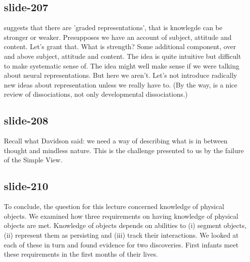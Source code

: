 \documentclass[12pt,\papersize]{extarticle}
\begin{document}
 
\subsection{slide-207}
\citet{Munakata:2001ch} suggests that there are 'graded representations', that is knowlegde can be stronger or weaker.
Presupposes we have an account of subject, attitude and content. Let's grant that.
What is strength? Some additional component, over and above subject, attitude and content.
The idea is quite intuitive but difficult to make systematic sense of.
The idea might well make sense if we were talking about neural representations.
But here we aren't. Let's not introduce radically new ideas about representation unless we really have to.
(By the way, \citet{Munakata:2001ch} is a nice review of dissociations, not only developmental dissociations.)
 
 
\subsection{slide-208}
Recall what Davidson said: we need a way of describing what is in between thought and mindless nature. This is the challenge presented to us by the failure of the Simple View.
 
 
\subsection{slide-210}
To conclude, the question for this lecture concerned knowledge of physical objects.
We examined how three requirements on having knowledge of physical objects are met.
Knowledge of objects depends on abilities to (i) segment objects, (ii) represent them as persisting and (iii) track their interactions.
We looked at each of these in turn and found evidence for two discoveries. First infants meet these requirements in the first months of their lives.
 
 
\end{document}
